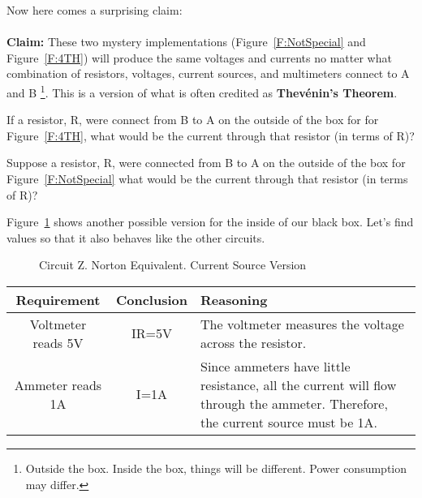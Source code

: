 Now here comes a surprising claim:\\
\\
\noindent
\textbf{Claim:} These two mystery implementations (Figure~\ref{F:NotSpecial} and Figure~\ref{F:4TH}) will produce the same voltages and currents no matter what combination of resistors, voltages, current sources, and multimeters connect to A and B \footnote{Outside the box. Inside the box, things will be different. Power consumption may differ.}. This is a version of what is often credited as \textbf{Thev\'enin's Theorem}.

\begin{alevel}
If a resistor, R, were connect from B to A on the outside of the box for for Figure~\ref{F:4TH}, what would be the current through that resistor (in terms of R)?
\end{alevel}

\begin{clevel}
Suppose a resistor, R, were connected from B to A on the outside of the box for Figure~\ref{F:NotSpecial} what would be the current through that resistor (in terms of R)?
\end{clevel}

Figure~\ref{F:4NOR} shows another possible version for the inside of our black box. Let's find values so that it also behaves like the other circuits.

\begin{figure}[H]
\begin{center}
\caption{Circuit Z. Norton Equivalent. Current Source Version}
\label{F:4NOR}
\end{center}
\end{figure}

\begin{table}[H]
\begin{center}
\begin{tabular}{|c|c|p{60mm}|} \hline
Requirement & Conclusion & Reasoning \\ \hline
Voltmeter reads 5V & IR=5V & The voltmeter measures the voltage across the resistor. \\ \hline
Ammeter reads 1A & I=1A	& Since ammeters have little resistance, all the current will flow through the ammeter. Therefore, the current source must be 1A. \\ \hline
\end{tabular}
\end{center}
\end{table}

